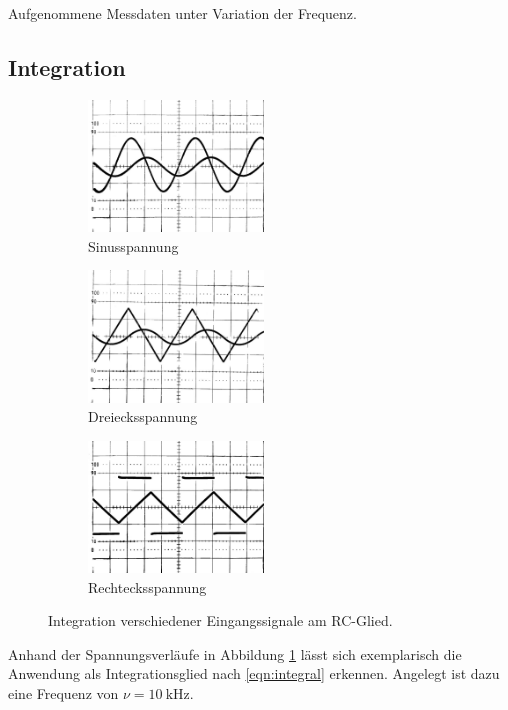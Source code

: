 \begin{table}
	\centering
	\vspace{2.46ex}
	\caption{Aufgenommene Messdaten unter Variation der Frequenz.}
	
	\label{tab:phase}
\end{table}

\subsection{Integration}

\begin{figure}
	\begin{subfigure}{0.32\textwidth}
		\centering
		\includegraphics[height=3.5cm]{content/sinus.jpg}
		\caption{Sinusspannung}
	\end{subfigure}
	\hfill
	\begin{subfigure}{0.32\textwidth}
		\centering
		\includegraphics[height=3.5cm]{content/dreieck.jpg}
		\caption{Dreiecksspannung}
	\end{subfigure}
	\hfill
	\begin{subfigure}{0.32\textwidth}
		\centering
		\includegraphics[height=3.5cm]{content/rechteck.jpg}
		\caption{Rechtecksspannung}
	\end{subfigure}
	\caption{Integration verschiedener Eingangssignale am RC\hspace{0.15ex}-Glied.}
	\label{fig:integral}
\end{figure}

Anhand der Spannungsverläufe in Abbildung \ref{fig:integral} lässt sich exemplarisch die Anwendung als
Integrationsglied nach \eqref{eqn:integral} erkennen. Angelegt ist dazu eine Frequenz von
$\nu = \qty{10}{\kilo\hertz}$.

